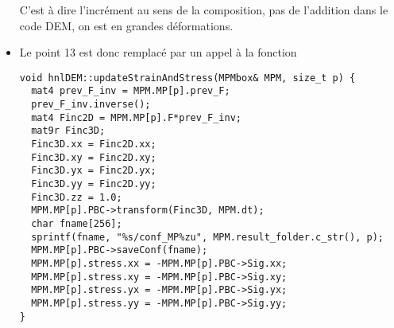 \documentclass[12pt]{article}
\begin{document}
\begin{itemize}
C'est à dire l'incrément au sens de la composition, pas de l'addition dans le code DEM, on est en grandes déformations.
\item
Le point 13 est donc remplacé par un appel à la fonction 
\begin{verbatim} 
void hnlDEM::updateStrainAndStress(MPMbox& MPM, size_t p) {
  mat4 prev_F_inv = MPM.MP[p].prev_F;
  prev_F_inv.inverse();
  mat4 Finc2D = MPM.MP[p].F*prev_F_inv;
  mat9r Finc3D;
  Finc3D.xx = Finc2D.xx;
  Finc3D.xy = Finc2D.xy;
  Finc3D.yx = Finc2D.yx;
  Finc3D.yy = Finc2D.yy;
  Finc3D.zz = 1.0;
  MPM.MP[p].PBC->transform(Finc3D, MPM.dt);
  char fname[256];
  sprintf(fname, "%s/conf_MP%zu", MPM.result_folder.c_str(), p);
  MPM.MP[p].PBC->saveConf(fname);
  MPM.MP[p].stress.xx = -MPM.MP[p].PBC->Sig.xx;
  MPM.MP[p].stress.xy = -MPM.MP[p].PBC->Sig.xy;
  MPM.MP[p].stress.yx = -MPM.MP[p].PBC->Sig.yx;
  MPM.MP[p].stress.yy = -MPM.MP[p].PBC->Sig.yy;
}
\end{verbatim}
\end{itemize}


\end{document}
